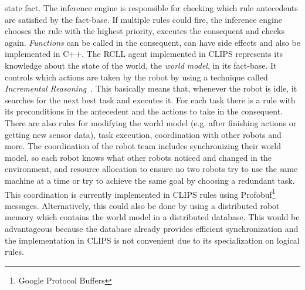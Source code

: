 \documentclass[a4paper,11pt]{article}
\begin{document}
state fact. The inference engine is responsible for checking which
rule antecedents are satisfied by the fact-base. If multiple rules
could fire, the inference engine chooses the rule with the highest
priority, executes the consequent and checks again. \emph{Functions}
can be called in the consequent, can have side effects and also be
implemented in C++. The RCLL agent implemented in CLIPS represents its
knowledge about the state of the world, the \emph{world model}, in its
fact-base. It controls which actions are taken by the robot by using a
technique called \emph{Incremental Reasoning}~\cite{CLIPS-Agent}. This
basically means that, whenever the robot is idle, it searches for the
next best task and executes it. For each task there is a rule with its
preconditions in the antecedent and the actions to take in the
consequent. There are also rules for modifying the world model
(e.g. after finishing actions or getting new sensor data), task
execution, coordination with other robots and more. The coordination
of the robot team includes synchronizing their world model, so each
robot knows what other robots noticed and changed in the environment,
and resource allocation to ensure no two robots try to use the same
machine at a time or try to achieve the same goal by choosing a
redundant task. This coordination is currently implemented in CLIPS
rules using Profobuf\footnote{Google Protocol Buffers}
messages. Alternatively, this could also be done by using a
distributed robot memory which contains the world model in a
distributed database. This would be advantageous
because the database already provides efficient synchronization and
the implementation in CLIPS is not convenient due to its
specialization on logical rules.
\end{document}
